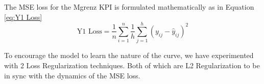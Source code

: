 \documentclass{report} %
\begin{document}
The \ac{MSE} loss for the Mgrenz \ac{KPI} is formulated mathematically as in Equation \ref{eq:Y1 Loss}
\begin{equation}
    \text{Y1 Loss} = \frac{1}{n} \sum_{i=1}^{n} \frac{1}{h} \sum_{j=1}^{h} (y_{ij} - \hat{y}_{ij})^2
    \label{eq:Y1 Loss}
\end{equation} 


\vspace{1em} %


To encourage the model to learn the nature of the curve, we have experimented with 2 Loss Regularization techniques. Both of which are L2 Regularization to be in sync with the dynamics of the \ac{MSE} loss.\\
\end{document}
